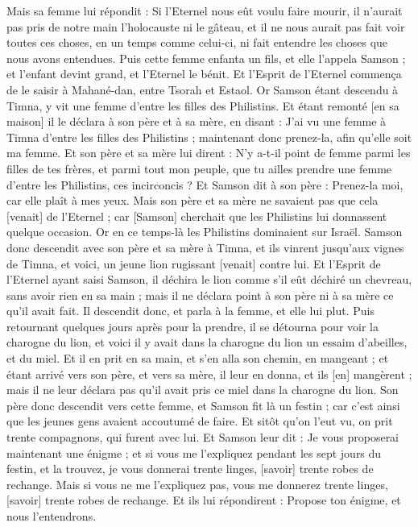\begin{multicols}{2}
Mais sa femme lui répondit : Si l'Eternel nous eût voulu faire mourir, il n'aurait pas pris de notre main l'holocauste ni le gâteau, et il ne nous aurait pas fait voir toutes ces choses, en un temps comme celui-ci, ni fait entendre les choses que nous avons entendues.
Puis cette femme enfanta un fils, et elle l'appela Samson ; et l'enfant devint grand, et l'Eternel le bénit.
Et l'Esprit de l'Eternel commença de le saisir à Mahané-dan, entre Tsorah et Estaol.
\VerseOne{}Or Samson étant descendu à Timna, y vit une femme d'entre les filles des Philistins.
Et étant remonté [en sa maison] il le déclara à son père et à sa mère, en disant : J'ai vu une femme à Timna d'entre les filles des Philistins ; maintenant donc prenez-la, afin qu'elle soit ma femme.
Et son père et sa mère lui dirent : N'y a-t-il point de femme parmi les filles de tes frères, et parmi tout mon peuple, que tu ailles prendre une femme d'entre les Philistins, ces incirconcis ? Et Samson dit à son père : Prenez-la moi, car elle plaît à mes yeux.
Mais son père et sa mère ne savaient pas que cela [venait] de l'Eternel ; car [Samson] cherchait que les Philistins lui donnassent quelque occasion. Or en ce temps-là les Philistins dominaient sur Israël.
Samson donc descendit avec son père et sa mère à Timna, et ils vinrent jusqu'aux vignes de Timna, et voici, un jeune lion rugissant [venait] contre lui.
Et l'Esprit de l'Eternel ayant saisi Samson, il déchira le lion comme s'il eût déchiré un chevreau, sans avoir rien en sa main ; mais il ne déclara point à son père ni à sa mère ce qu'il avait fait.
Il descendit donc, et parla à la femme, et elle lui plut.
Puis retournant quelques jours après pour la prendre, il se détourna pour voir la charogne du lion, et voici il y avait dans la charogne du lion un essaim d'abeilles, et du miel.
Et il en prit en sa main, et s'en alla son chemin, en mangeant ; et étant arrivé vers son père, et vers sa mère, il leur en donna, et ils [en] mangèrent ; mais il ne leur déclara pas qu'il avait pris ce miel dans la charogne du lion.
Son père donc descendit vers cette femme, et Samson fit là un festin ; car c'est ainsi que les jeunes gens avaient accoutumé de faire.
Et sitôt qu'on l'eut vu, on prit trente compagnons, qui furent avec lui.
Et Samson leur dit : Je vous proposerai maintenant une énigme ; et si vous me l'expliquez pendant les sept jours du festin, et la trouvez, je vous donnerai trente linges, [savoir] trente robes de rechange.
Mais si vous ne me l'expliquez pas, vous me donnerez trente linges, [savoir] trente robes de rechange. Et ils lui répondirent : Propose ton énigme, et nous l'entendrons.

\end{multicols}
